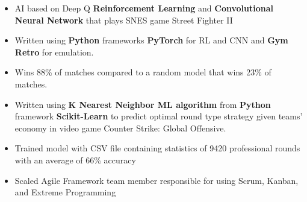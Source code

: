 
\smallskip
\begin{itemize}
\item AI based on Deep Q \textbf{Reinforcement Learning} and \textbf{Convolutional Neural Network} that plays SNES game Street Fighter II
\smallskip
\item Written using \textbf{Python} frameworks \textbf{PyTorch} for RL and CNN and \textbf{Gym Retro} for emulation.
\smallskip
\item Wins 88\% of matches compared to a random model that wins 23\% of matches.
\end{itemize}

\divider

\begin{itemize}
\item Written using \textbf{K Nearest Neighbor ML algorithm} from \textbf{Python} framework \textbf{Scikit-Learn} to predict optimal round type strategy given teams' economy in video game Counter Strike: Global Offensive.
\smallskip
\item Trained model with CSV file containing statistics of 9420 professional rounds with an average of 66\% accuracy
\end{itemize}






\begin{itemize}
\item Scaled Agile Framework team member responsible for using Scrum, Kanban, and Extreme Programming
\end{itemize}







\divider


